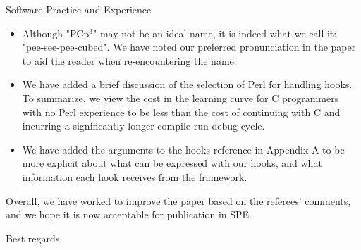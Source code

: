 \documentclass{letter}
\newcommand{\pcp}{\mbox{\textsf{PCp}$^3$}}
\begin{document}
\begin{letter}{
Software Practice and Experience}
\begin{itemize}
\item Although "\pcp" may not be an ideal name, it is indeed what we call
it: "pee-see-pee-cubed".  We have noted our preferred pronunciation in
the paper to aid the reader when re-encountering the name.

\item We have added a brief discussion of the selection of Perl for
handling hooks.  To summarize, we view the cost in the learning curve for C
programmers with no Perl experience to be less than the cost of continuing
with C and incurring a significantly longer compile-run-debug cycle.

\item We have added the arguments to the hooks reference in Appendix A 
      to be more explicit about what can be expressed with our hooks,
      and what information each hook receives from the framework.

\end{itemize}

Overall, we have worked to improve the paper based on the referees'
comments, and we hope it is now acceptable for publication in SPE.

\closing{Best regards,}
\end{letter}
\end{document}
